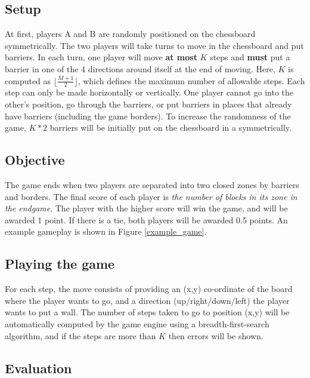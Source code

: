 \documentclass[twoside,11pt]{article}
\begin{document}
\subsection{Setup}

At first, players A and B are randomly positioned on the chessboard symmetrically. 
%
The two players will take turns to move in the chessboard and put barriers.
%
In each turn, one player will move \textbf{at most} $K$ steps and \textbf{must} put a barrier in one of the 4 directions around itself at the end of moving. Here, $K$ is computed as $\lfloor\frac{M+1}{2}\rfloor$, which defines the maximum number of allowable steps. 
%
Each step can only be made horizontally or vertically.
%
One player cannot go into the other's position, go through the barriers, or put barriers in places that already have barriers (including the game borders). To increase the randomness of the game, $K*2$ barriers will be initially put on the chessboard in a symmetrically.

\subsection{Objective}

The game ends when two players are separated into two closed zones by barriers and borders.
The final score of each player is \textit{the number of blocks in its zone in the endgame}.
%
The player with the higher score will win the game, and will be awarded 1 point.
If there is a tie, both players will be awarded 0.5 points. An example gameplay is shown in Figure \ref{example_game}.

\subsection{Playing the game}

For each step, the move consists of providing an (x,y) co-ordinate of the board where the player wants to go, and a direction (up/right/down/left) the player wants to put a wall. The number of steps taken to go to position (x,y) will be automatically computed by the game engine using a breadth-first-search algorithm, and if the steps are more than $K$ then errors will be shown.

\subsection{Evaluation}
\end{document}
